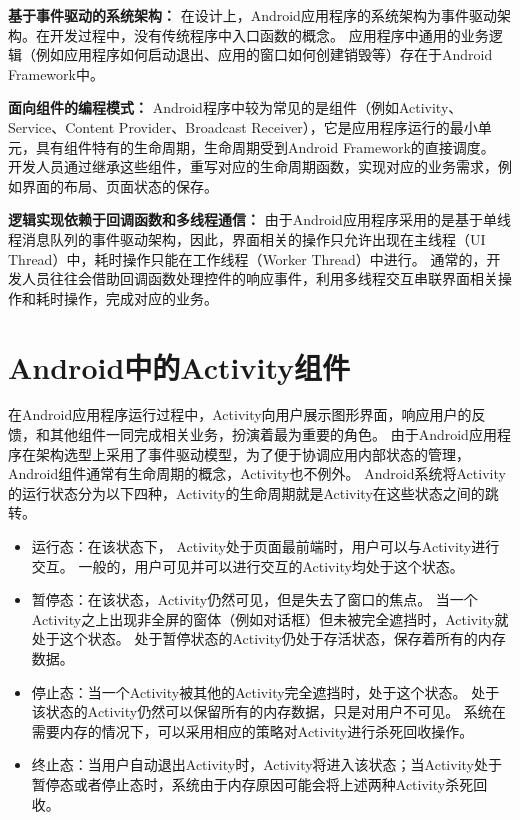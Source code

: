 \textbf{基于事件驱动的系统架构：}
在设计上，Android应用程序的系统架构为事件驱动架构。在开发过程中，没有传统程序中入口函数的概念。
应用程序中通用的业务逻辑（例如应用程序如何启动退出、应用的窗口如何创建销毁等）存在于Android Framework中。

\textbf{面向组件的编程模式：}
Android程序中较为常见的是组件（例如Activity、Service、Content Provider、Broadcast Receiver），它是应用程序运行的最小单元，具有组件特有的生命周期，生命周期受到Android Framework的直接调度。
开发人员通过继承这些组件，重写对应的生命周期函数，实现对应的业务需求，例如界面的布局、页面状态的保存。

\textbf{逻辑实现依赖于回调函数和多线程通信：}
由于Android应用程序采用的是基于单线程消息队列的事件驱动架构，因此，界面相关的操作只允许出现在主线程（UI Thread）中，耗时操作只能在工作线程（Worker Thread）中进行。
通常的，开发人员往往会借助回调函数处理控件的响应事件，利用多线程交互串联界面相关操作和耗时操作，完成对应的业务。


\section{Android中的Activity组件}



在Android应用程序运行过程中，Activity向用户展示图形界面，响应用户的反馈，和其他组件一同完成相关业务，扮演着最为重要的角色。%
由于Android应用程序在架构选型上采用了事件驱动模型，为了便于协调应用内部状态的管理，Android组件通常有生命周期的概念，Activity也不例外。
Android系统将Activity的运行状态分为以下四种，Activity的生命周期就是Activity在这些状态之间的跳转。



\begin{itemize}
		\setlength{\itemsep}{-5pt}
		
	\item 运行态：在该状态下， Activity处于页面最前端时，用户可以与Activity进行交互。
	一般的，用户可见并可以进行交互的Activity均处于这个状态。
	
	\item 暂停态：在该状态，Activity仍然可见，但是失去了窗口的焦点。
	当一个Activity之上出现非全屏的窗体（例如对话框）但未被完全遮挡时，Activity就处于这个状态。
	处于暂停状态的Activity仍处于存活状态，保存着所有的内存数据。%

	\item 停止态：当一个Activity被其他的Activity完全遮挡时，处于这个状态。
	处于该状态的Activity仍然可以保留所有的内存数据，只是对用户不可见。
	系统在需要内存的情况下，可以采用相应的策略对Activity进行杀死回收操作。
	
	\item 终止态：当用户自动退出Activity时，Activity将进入该状态；当Activity处于暂停态或者停止态时，系统由于内存原因可能会将上述两种Activity杀死回收。
\end{itemize}




